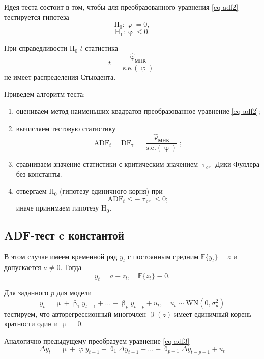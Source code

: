 \documentclass[a4paper, 14pt]{extreport}
\numberwithin{equation}{subsection}
\renewcommand{\leq}{\leqslant}
\renewcommand{\beta}{\upbeta}
\renewcommand{\varphi}{\upvarphi}
\renewcommand{\tau}{\uptau}
\renewcommand{\theta}{\uptheta}
\renewcommand{\mu}{\upmu}
\newcommand{\E}{\mathbb E}
\numberwithin{equation}{section}
\begin{document}
	Идея теста состоит в том, чтобы для преобразованного уравнения \eqref{eq-adf2} тестируется гипотеза
	$$\text{H}_0:\varphi=0,$$ $$\text{H}_1:\varphi\leq 0.$$
	
	При справедливости $\text{H}_0$ $t$-статистика
	\begin{equation}
		t=\dfrac{\widehat{\varphi}_{\text{МНК}}}{\text{s.e.}(\varphi)}
	\end{equation}
	не имеет распределения Стьюдента.

	Приведем алгоритм теста:
	\begin{enumerate}
		\item оцениваем метод наименьших квадратов преобразованное уравнение \eqref{eq-adf2};
		\item вычисляем тестовую статистику
		\begin{equation}
			\text{ADF}_t=\text{DF}_\tau=\dfrac{\widehat{\varphi}_{\text{МНК}}}{\text{s.e.}(\varphi)};
		\end{equation}
		\item сравниваем значение статистики с критическим значением $\tau_{cr}$ Дики-Фуллера без константы.
		\item отвергаем $\text{H}_0$ (гипотезу единичного корня) при
		\begin{equation}\text{ADF}_t\leq -\tau_{cr}\leq 0;\end{equation}
		иначе принимаем гипотезу $\text{H}_0$.
	\end{enumerate}
	\subsection{ADF-тест c константой}
	
	В этом случае имеем временной ряд $y_t$ с постоянным средним $\E \{y_t\}= a$ и допускается $a\neq0$.  Тогда
	\begin{equation}
		y_t=a+z_t,\quad \E \{z_t\}\equiv0.
	\end{equation}
	
	Для заданного $p$ для модели
	\begin{equation}
		y_t=\mu+\beta_1y_{t-1}+\dots+\beta_py_{t-p}+u_t,\quad u_t\sim \text{WN}(0,\sigma^2_u)
		\label{eq-adf3}
	\end{equation}
	тестируем, что авторегрессионный многочлен $\beta(z)$ имеет единичный корень кратности один и $\mu=0$.
	
	Аналогично предыдущему преобразуем уравнение \eqref{eq-adf3}
	\begin{equation}
		\Delta y_t=\mu+\varphi y_{t-1}+\theta_1\Delta y_{t-1}+\dots+\theta_{p-1}\Delta y_{t-p+1}+u_t
		\label{eq-adf4}
	\end{equation}
	
\end{document}
